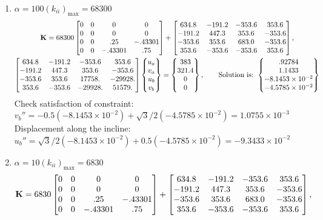 \begin{example}
{\begin{enumerate}[label=(\arabic*),leftmargin=*]
\begin{gather*}
    \end{gather*}
    Check satisfaction of constraint: $v_b'' = -0.5(-8.2269\times10^{-2}) + \sqrt3/2(-4.7374\times10^{-2}) = 1.0741\times10^{-4}$\\
    Displacement along the incline: $u_b'' = \sqrt3/2(-8.2269\times10^{-2}) + 0.5(-4.7374\times10^{-2}) = -9.4934\times10^{-2}$
  \item $\alpha = 100(k_{ii})_{\max} = 68300$
    \begin{gather*}
      \mathbf{K} = 68300\begin{bmatrix}0 & 0 & 0 & 0\\ 0 & 0 & 0 & 0\\ 0 & 0 & .25 & -.43301\\ 0 & 0 & -.43301 & .75\end{bmatrix} + \begin{bmatrix}634.8 & -191.2 & -353.6 & 353.6\\ -191.2 & 447.3 & 353.6 & -353.6\\ -353.6 & 353.6 & 683.0 & -353.6\\ 353.6 & -353.6 & -353.6 & 353.6\end{bmatrix},\\
      \begin{bmatrix}634.8 & -191.2 & -353.6 & 353.6\\ -191.2 & 447.3 & 353.6 & -353.6\\ -353.6 & 353.6 & 17758. & -29928.\\ 353.6 & -353.6 & -29928. & 51579.\end{bmatrix}\begin{Bmatrix}u_a\\ v_a\\ u_b\\ v_b\end{Bmatrix} = \begin{Bmatrix}383\\ 321.4\\ 0\\ 0\end{Bmatrix},\qquad
      \text{Solution is: }\begin{Bmatrix}.92784\\ 1.1433\\ -8.1453\times10^{-2}\\ -4.5785\times10^{-2}\end{Bmatrix}
    \end{gather*}
    Check satisfaction of constraint: $v_b'' = -0.5(-8.1453\times10^{-2}) + \sqrt3/2(-4.5785\times10^{-2}) = 1.0755\times10^{-3}$\\
    Displacement along the incline: $u_b'' = \sqrt3/2(-8.1453\times10^{-2}) + 0.5(-4.5785\times10^{-2}) = -9.3433\times10^{-2}$
  \item $\alpha = 10(k_{ii})_{\max} = 6830$
    \begin{gather*}
      \Kmat = 6830\bmat{0 & 0 & 0 & 0\\ 0 & 0 & 0 & 0\\ 0 & 0 & .25 & -.43301\\ 0 & 0 & -.43301 & .75} + \bmat{634.8 & -191.2 & -353.6 & 353.6\\ -191.2 & 447.3 & 353.6 & -353.6\\ -353.6 & 353.6 & 683.0 & -353.6\\ 353.6 & -353.6 & -353.6 & 353.6},\\

\end{gather*}
\end{enumerate}}
\end{example}
